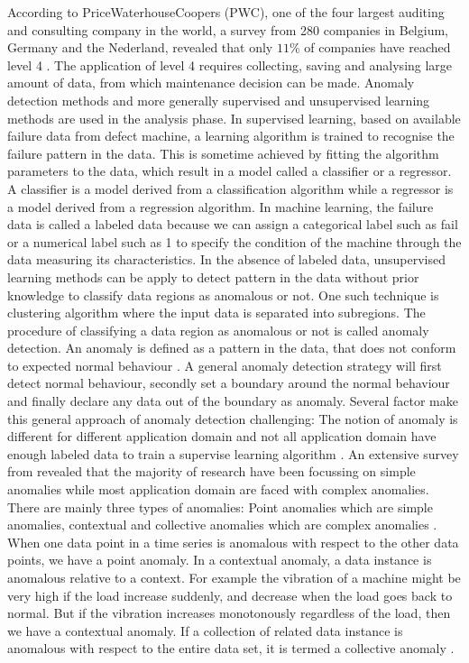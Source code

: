 \documentclass[11pt, oneside]{article}   	%
\begin{document}
\justify
According to PriceWaterhouseCoopers (PWC), one of the four largest auditing and consulting company in the world,  a survey from 280 companies in Belgium, Germany and the Nederland, revealed that only 
$11 \%$ of companies have reached level 4 \cite{pwc}. The application of level 4 requires collecting, saving and analysing large amount of data, from which maintenance decision can be made. Anomaly detection methods and more generally supervised and unsupervised learning methods are used in the analysis phase.
\justify
In supervised learning, based on available failure data from defect machine, a learning algorithm is trained to recognise the failure pattern in the data. This is sometime achieved by fitting the algorithm parameters to the data, which result in a model called a classifier or a regressor. A classifier is a model derived from a classification algorithm while a regressor is a model derived from a regression algorithm.
\justify
 In machine learning, the failure data is called a labeled data because we can assign a categorical label such as fail or a numerical label such as 1 to specify the condition of the machine through the data measuring its characteristics. In the absence of labeled data, unsupervised learning methods can be apply to detect pattern in the data without prior knowledge to classify data regions as anomalous or not. One such technique is clustering algorithm where the input data is separated into subregions.
\justify
The procedure of classifying a data region as anomalous or not is called anomaly detection. An anomaly is defined as a pattern in the data, that does not conform to expected normal behaviour \cite{chandola}. A general anomaly detection strategy will first detect normal behaviour, secondly set a boundary around the normal behaviour and finally declare any data out of the boundary as anomaly.
\justify
Several factor make this general approach of anomaly detection challenging: The notion of anomaly is different for different application domain and not all application domain have enough labeled data to train a supervise learning algorithm \cite{chandola}. An extensive survey from \cite{chandola} revealed that the majority of research have been focussing on simple anomalies while most application domain are faced with complex anomalies. There are mainly three types of anomalies: Point anomalies which are simple anomalies, contextual  and collective anomalies which are complex anomalies \cite{chandola}. When one data point in a time series is anomalous with respect to the other data points, we have a point anomaly. In a contextual anomaly, a data instance is anomalous relative to a context. For example the vibration of a machine might be very high if the load increase suddenly, and decrease when the load goes back to normal. But if the vibration increases monotonously regardless of the load, then we have a contextual anomaly. If a collection of related data instance is anomalous with respect to the entire data set, it is termed a collective anomaly \cite{chandola}.
\end{document}
